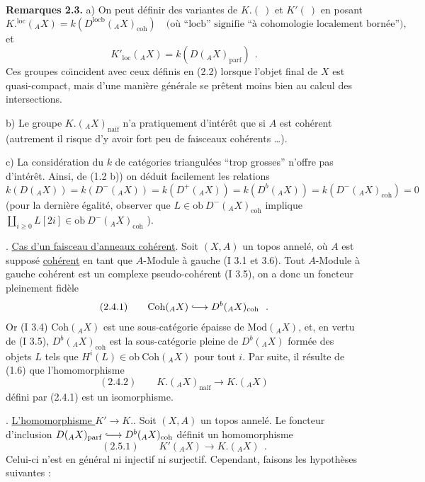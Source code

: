 \medskip

\noindent\textbf{Remarques 2.3.} a) On peut d\'{e}finir des variantes de $K.(\ )$ et $K'(\ )$ en posant
\[
K.^{\mathrm{loc}}({}_A X) = k(D^{\mathrm{locb}}({}_A X)_{\mathrm{coh}}) \quad \text{(o\`{u} ``locb'' signifie ``\`{a} cohomologie localement born\'{e}e''),}
\]
et
\[
K'_{\mathrm{loc}}({}_A X) = k(D({}_A X)_{\mathrm{parf}})\ \ .
\]
Ces groupes co\"{\i}ncident avec ceux d\'{e}finis en (2.2) lorsque l'objet final de $X$ est quasi-compact, mais d'une mani\`{e}re g\'{e}n\'{e}rale se pr\^{e}tent moins bien au calcul des intersections.

\smallskip

b) Le groupe $K.({}_A X)_{\mathrm{naif}}$ n'a pratiquement d'int\'{e}r\^{e}t que si $A$ est coh\'{e}rent (autrement il risque d'y avoir fort peu de faisceaux coh\'{e}rents \ldots).

\smallskip

c) La consid\'{e}ration du $k$ de cat\'{e}gories triangul\'{e}es ``trop grosses'' n'offre pas d'int\'{e}r\^{e}t. Ainsi, de (1.2 b)) on d\'{e}duit facilement les relations
\[
k(D({}_A X)) = k(D^-({}_A X)) = k(D^+({}_A X)) = k(D^b({}_A X)) = k(D^-({}_A X)_{\mathrm{coh}}) = 0
\]
(pour la derni\`{e}re \'{e}galit\'{e}, observer que $L \in \mathrm{ob}\ D^-({}_A X)_{\mathrm{coh}}$ implique $\coprod_{i \geq 0} L[2i] \in \mathrm{ob}\ D^-({}_A X)_{\mathrm{coh}}$ ).

\medskip

. \underline{Cas d'un faisceau d'anneaux coh\'{e}rent}. Soit $(X, A)$ un topos annel\'{e}, o\`{u} $A$ est suppos\'{e} \underline{coh\'{e}rent} en tant que $A$-Module \`{a} gauche (I 3.1 et 3.6). Tout $A$-Module \`{a} gauche coh\'{e}rent est un complexe pseudo-coh\'{e}rent (I 3.5), on a donc un foncteur pleinement fid\`{e}le
\[
\mathrm{(2.4.1)} \qquad \mathrm{Coh}({}_A X) \lhook\joinrel\longrightarrow D^b({}_A X)_{\mathrm{coh}}\ \ .
\]
Or (I 3.4) $\mathrm{Coh}({}_A X)$ est une sous-cat\'{e}gorie \'{e}paisse de $\mathrm{Mod}({}_A X)$, et, en vertu de (I 3.5), $D^b({}_A X)_{\mathrm{coh}}$ est la sous-cat\'{e}gorie pleine de $D^b({}_A X)$ form\'{e}e des objets $L$ tels que $H^i(L) \in \mathrm{ob}\ \mathrm{Coh}({}_A X)$ pour tout $i$. Par suite, il r\'{e}sulte de (1.6) que l'homomorphisme
\[
\mathrm{(2.4.2)} \qquad K.({}_A X)_{\mathrm{naif}} \longrightarrow K.({}_A X)
\]
d\'{e}fini par (2.4.1) est un isomorphisme.

\medskip

. \underline{L'homomorphisme $K' \longrightarrow K.$}. Soit $(X, A)$ un topos annel\'{e}. Le foncteur d'inclusion $D({}_A X)_{\mathrm{parf}} \lhook\joinrel\longrightarrow D^b({}_A X)_{\mathrm{coh}}$ d\'{e}finit un homomorphisme
\[
\mathrm{(2.5.1)} \qquad K'({}_A X) \longrightarrow K.({}_A X)\ \ .
\]
Celui-ci n'est en g\'{e}n\'{e}ral ni injectif ni surjectif. Cependant, faisons les hypoth\`{e}ses suivantes :

